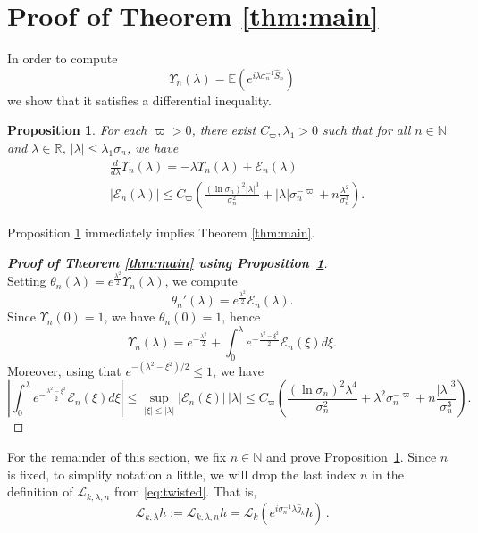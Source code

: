 \documentclass{amsart}
\numberwithin{equation}{section}
\newtheorem{prop}[thm]{Proposition}
\newcommand\cE{{\mathcal E}}
\newcommand\cL{{\mathcal L}}
\newcommand\bE{{\mathbb E}}
\newcommand\bN{{\mathbb N}}
\newcommand\bR{{\mathbb R}}
\newcommand{\hS}{\hat{S}}
\begin{document}
\section{Proof of Theorem \ref{thm:main}}\label{sec:real_PF}
In order to compute
\begin{equation}\label{eq:upsilon}
\Upsilon_n(\lambda)=\bE\left(e^{i\lambda \sigma_n^{-1} \hS_n}\right)
\end{equation}
we show that it satisfies a differential inequality.
\begin{prop}\label{prop:diff1}
For each $\varpi>0$, there exist $C_\varpi,\lambda_1>0$ such that for all $n\in\bN$ and $\lambda\in\bR$, $|\lambda|\leq \lambda_1\sigma_n$, we have
\[
\begin{split}
&\frac{d}{d\lambda}\Upsilon_n(\lambda)=-\lambda \Upsilon_n(\lambda)+\cE_n(\lambda)\\
&|\cE_n(\lambda)|\leq C_\varpi\left(\frac{(\ln \sigma_n)^2  |\lambda|^3 }{\sigma_n^2}+ |\lambda|\sigma_n^{-\varpi}+n\frac{\lambda^2}{\sigma_n^3}\right).
\end{split}
\]
\end{prop}
Proposition \ref{prop:diff1} immediately implies Theorem \ref{thm:main}.
\begin{proof}[\bf \em  Proof of Theorem \ref{thm:main} using Proposition~\ref{prop:diff1}]\ \\
Setting $\theta_n(\lambda) = e^{\frac{\lambda^2}2} \Upsilon_n(\lambda)$, we compute 
\[
\theta_n'(\lambda)=e^{\frac{\lambda^2}2}\cE_n(\lambda).
\]
Since $\Upsilon_n(0)=1$, we have $\theta_n(0)=1$, hence
\[
\Upsilon_n(\lambda)=e^{-\frac{\lambda^2}2}+\int_0^\lambda e^{-\frac{\lambda^2-\xi^2}2}\cE_n(\xi)d\xi.
\]
Moreover, using that $e^{- (\lambda^2 - \xi^2)/2} \le 1$, we have
\[
\left|\int_0^\lambda e^{-\frac{\lambda^2-\xi^2}2}\cE_n(\xi)d\xi\right|\leq\sup_{|\xi|\leq|\lambda|}{|\cE_n(\xi)| }\,  |\lambda| \leq C_\varpi\left(\frac{(\ln \sigma_n)^2\lambda^4}{\sigma_n^2}+\lambda^2 \sigma_n^{-\varpi}+n\frac{|\lambda|^3}{\sigma_n^3}\right).
\]
\end{proof}
For the remainder of this section, we fix $n \in \mathbb{N}$ and prove Proposition~\ref{prop:diff1}.  Since $n$ is fixed, to simplify
notation a little, we will drop the last index $n$ in the definition of $\cL_{k, \lambda, n}$ from \eqref{eq:twisted}.  That is,
\begin{equation}
\label{eq:simpler}
\cL_{k , \lambda} h := \cL_{k, \lambda, n} h = \cL_k(e^{i \sigma_n^{-1} \lambda {\hat g_k } } h) \, .
\end{equation}
\end{document}
